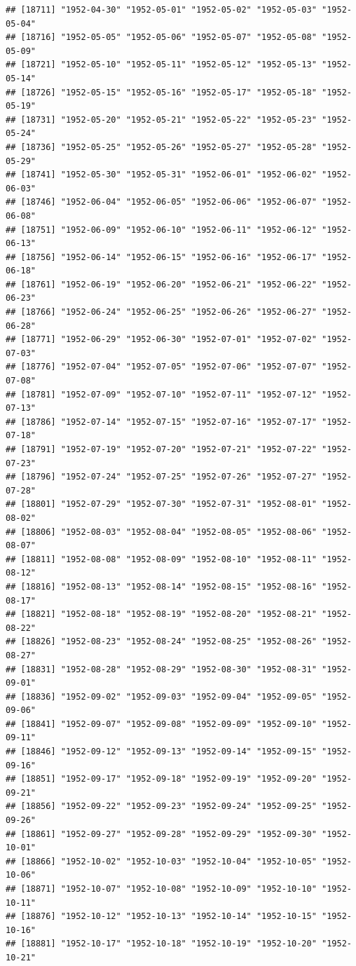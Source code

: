\documentclass{article}\usepackage[]{graphicx}\usepackage[]{color}
\makeatletter
\newenvironment{kframe}{%
 \def\at@end@of@kframe{}%
 \ifinner\ifhmode%
  \def\at@end@of@kframe{\end{minipage}}%
  \begin{minipage}{\columnwidth}%
 \fi\fi%
 \def\FrameCommand##1{\hskip\@totalleftmargin \hskip-\fboxsep
 \colorbox{shadecolor}{##1}\hskip-\fboxsep
     \hskip-\linewidth \hskip-\@totalleftmargin \hskip\columnwidth}%
 \MakeFramed {\advance\hsize-\width
   \@totalleftmargin\z@ \linewidth\hsize
   \@setminipage}}%
 {\par\unskip\endMakeFramed%
 \at@end@of@kframe}
\newenvironment{knitrout}{}{} %
\makeatother
\begin{document}
\begin{description}
\begin{knitrout}
\begin{kframe}
\begin{verbatim}
## [18711] "1952-04-30" "1952-05-01" "1952-05-02" "1952-05-03" "1952-05-04"
## [18716] "1952-05-05" "1952-05-06" "1952-05-07" "1952-05-08" "1952-05-09"
## [18721] "1952-05-10" "1952-05-11" "1952-05-12" "1952-05-13" "1952-05-14"
## [18726] "1952-05-15" "1952-05-16" "1952-05-17" "1952-05-18" "1952-05-19"
## [18731] "1952-05-20" "1952-05-21" "1952-05-22" "1952-05-23" "1952-05-24"
## [18736] "1952-05-25" "1952-05-26" "1952-05-27" "1952-05-28" "1952-05-29"
## [18741] "1952-05-30" "1952-05-31" "1952-06-01" "1952-06-02" "1952-06-03"
## [18746] "1952-06-04" "1952-06-05" "1952-06-06" "1952-06-07" "1952-06-08"
## [18751] "1952-06-09" "1952-06-10" "1952-06-11" "1952-06-12" "1952-06-13"
## [18756] "1952-06-14" "1952-06-15" "1952-06-16" "1952-06-17" "1952-06-18"
## [18761] "1952-06-19" "1952-06-20" "1952-06-21" "1952-06-22" "1952-06-23"
## [18766] "1952-06-24" "1952-06-25" "1952-06-26" "1952-06-27" "1952-06-28"
## [18771] "1952-06-29" "1952-06-30" "1952-07-01" "1952-07-02" "1952-07-03"
## [18776] "1952-07-04" "1952-07-05" "1952-07-06" "1952-07-07" "1952-07-08"
## [18781] "1952-07-09" "1952-07-10" "1952-07-11" "1952-07-12" "1952-07-13"
## [18786] "1952-07-14" "1952-07-15" "1952-07-16" "1952-07-17" "1952-07-18"
## [18791] "1952-07-19" "1952-07-20" "1952-07-21" "1952-07-22" "1952-07-23"
## [18796] "1952-07-24" "1952-07-25" "1952-07-26" "1952-07-27" "1952-07-28"
## [18801] "1952-07-29" "1952-07-30" "1952-07-31" "1952-08-01" "1952-08-02"
## [18806] "1952-08-03" "1952-08-04" "1952-08-05" "1952-08-06" "1952-08-07"
## [18811] "1952-08-08" "1952-08-09" "1952-08-10" "1952-08-11" "1952-08-12"
## [18816] "1952-08-13" "1952-08-14" "1952-08-15" "1952-08-16" "1952-08-17"
## [18821] "1952-08-18" "1952-08-19" "1952-08-20" "1952-08-21" "1952-08-22"
## [18826] "1952-08-23" "1952-08-24" "1952-08-25" "1952-08-26" "1952-08-27"
## [18831] "1952-08-28" "1952-08-29" "1952-08-30" "1952-08-31" "1952-09-01"
## [18836] "1952-09-02" "1952-09-03" "1952-09-04" "1952-09-05" "1952-09-06"
## [18841] "1952-09-07" "1952-09-08" "1952-09-09" "1952-09-10" "1952-09-11"
## [18846] "1952-09-12" "1952-09-13" "1952-09-14" "1952-09-15" "1952-09-16"
## [18851] "1952-09-17" "1952-09-18" "1952-09-19" "1952-09-20" "1952-09-21"
## [18856] "1952-09-22" "1952-09-23" "1952-09-24" "1952-09-25" "1952-09-26"
## [18861] "1952-09-27" "1952-09-28" "1952-09-29" "1952-09-30" "1952-10-01"
## [18866] "1952-10-02" "1952-10-03" "1952-10-04" "1952-10-05" "1952-10-06"
## [18871] "1952-10-07" "1952-10-08" "1952-10-09" "1952-10-10" "1952-10-11"
## [18876] "1952-10-12" "1952-10-13" "1952-10-14" "1952-10-15" "1952-10-16"
## [18881] "1952-10-17" "1952-10-18" "1952-10-19" "1952-10-20" "1952-10-21"

\end{verbatim}
\end{kframe}
\end{knitrout}
\end{description}
\end{document}
